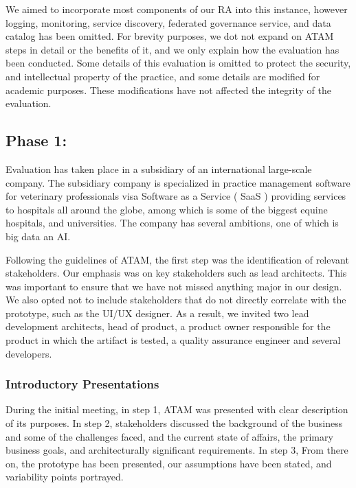 \documentclass[conference]{IEEEtran}
\begin{document}
We aimed to incorporate most components of our RA into this instance, however logging, monitoring, service discovery, federated governance service, and data catalog has been omitted. For brevity purposes, we dot not expand on ATAM steps in detail or the benefits of it, and we only explain how the evaluation has been conducted. Some details of this evaluation is omitted to protect the security, and intellectual property of the practice, and some details are modified for academic purposes. These modifications have not affected the integrity of the evaluation.  

\subsection{Phase 1:}

Evaluation has taken place in a subsidiary of an international large-scale company. The subsidiary company is specialized in practice management software for veterinary professionals visa Software as a Service ( SaaS ) providing services to hospitals all around the globe, among which is some of the biggest equine hospitals, and universities. The company has several ambitions, one of which is big data an AI. 

Following the guidelines of ATAM, the first step was the identification of relevant stakeholders. Our emphasis was on key stakeholders such as lead architects. This was important to ensure that we have not missed anything major in our design. We also opted not to include stakeholders that do not directly correlate with the prototype, such as the UI/UX designer. As a result, we invited two lead development architects, head of product, a product owner responsible for the product in which the artifact is tested, a quality assurance engineer and several developers. 

\subsubsection{Introductory Presentations}

During the initial meeting, in step 1, ATAM was presented with clear description of its purposes. In step 2, stakeholders discussed the background of the business and some of the challenges faced, and the current state of affairs, the primary business goals, and architecturally significant requirements. In step 3, From there on, the prototype has been presented, our assumptions have been stated, and variability points portrayed. 
\end{document}
